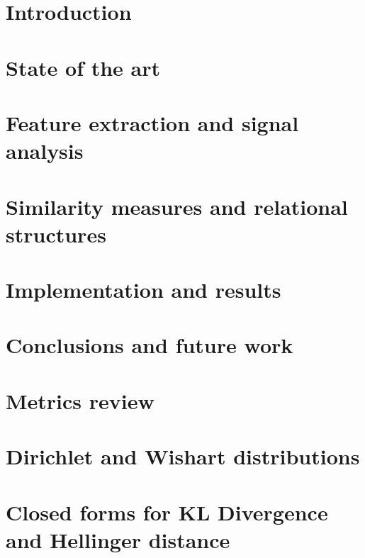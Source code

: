 \documentclass[pdftex,12pt,a4paper]{report}
\theoremstyle{definition}
\theoremstyle{remark}
\begin{document}
\tableofcontents
\newpage
\chapter{Introduction}

 
\chapter{State of the art}



\chapter{Feature extraction and signal analysis}
 

 
\chapter{Similarity measures and relational structures}



\chapter{Implementation and results}



\chapter{Conclusions and future work}







\appendix

\chapter{Metrics review}



\chapter{Dirichlet and Wishart distributions}



\chapter{Closed forms for KL Divergence and Hellinger distance}


\end{document}
